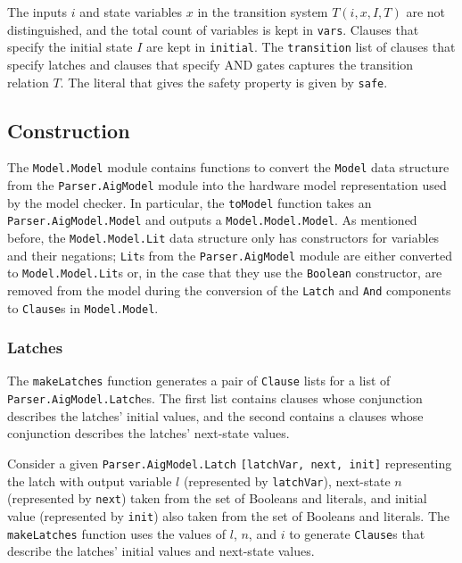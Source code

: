 \documentclass[12pt,a4paper,twoside,openright]{report}
\begin{document}
{The inputs $i$ and state variables $x$ in the transition system $T(i,x,I,T)$
are not distinguished, and the total count of variables is kept in \verb,vars,.
Clauses that specify the initial state $I$ are kept in \verb,initial,.
The \verb,transition, list of clauses that specify latches and clauses that specify AND
gates captures the transition relation $T$.
The literal that gives the safety property is given by \verb,safe,.

\subsection{Construction}

The \verb,Model.Model, module contains functions to convert the \verb,Model, data
structure from the \verb,Parser.AigModel, module into the hardware model representation used by
the model checker. In particular, the \verb,toModel, function takes an \verb,Parser.AigModel.Model,
and outputs a \verb,Model.Model.Model,. As mentioned before, the \verb,Model.Model.Lit,
data structure only has constructors for variables and their negations; \verb,Lit,s from
the \verb,Parser.AigModel, module are either converted to \verb,Model.Model.Lit,s or, in the case
that they use the \verb,Boolean, constructor, are removed from the model during the conversion of
the \verb,Latch, and \verb,And, components to \verb,Clause,s in \verb,Model.Model,.

\subsubsection{Latches}
The \verb,makeLatches, function generates a pair of \verb,Clause, lists
for a list of \verb,Parser.AigModel.Latch,es. The first list contains
clauses whose conjunction describes the latches' initial values,
and the second contains a clauses whose conjunction describes the
latches' next-state values.

Consider a given \verb,Parser.AigModel.Latch, \verb.[latchVar, next, init]. representing the latch with
output variable $l$ (represented by \verb,latchVar,), next-state $n$ (represented
by \verb,next,) taken from the set of Booleans and literals, and initial value (represented by \verb,init,)
also taken from the set of Booleans and literals. The \verb,makeLatches, function uses the
values of $l$, $n$, and $i$ to generate \verb,Clause,s that describe the latches' initial values and
next-state values.

}
\end{document}
